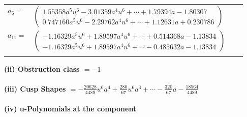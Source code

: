 \documentclass[1p]{elsarticle_modified}
\theoremstyle{definition}
\begin{document}
\begin{tabular}{m{7pt} m{180pt} m{7pt} m{180pt} }
\flushright $a_{6}=$&$\begin{pmatrix}1.55358 a^{5} u^{6}-3.01359 a^{4} u^{6}+\cdots+1.79394 a-1.80307\\0.747160 a^{5} u^{6}-2.29762 a^{4} u^{6}+\cdots+1.12631 a+0.230786\end{pmatrix}$ \\
\flushright $a_{11}=$&$\begin{pmatrix}-1.16329 a^{5} u^{6}+1.89597 a^{4} u^{6}+\cdots+0.514368 a-1.13834\\-1.16329 a^{5} u^{6}+1.89597 a^{4} u^{6}+\cdots-0.485632 a-1.13834\end{pmatrix}$\\&\end{tabular}
\flushleft \textbf{(ii) Obstruction class $= -1$}\\~\\
\flushleft \textbf{(iii) Cusp Shapes $= -\frac{20628}{4489} u^6 a^4+\frac{280}{67} u^6 a^3+\cdots-\frac{320}{67} a-\frac{18564}{4489}$}\\~\\
\newpage\renewcommand{\arraystretch}{1}
\flushleft \textbf{(iv) u-Polynomials at the component}\newline \\
\end{document}
